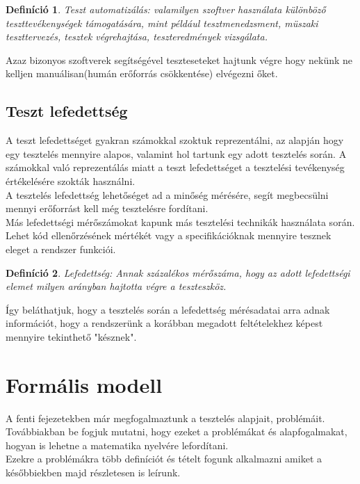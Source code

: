 \documentclass[12pt]{article}
\newtheorem{defin}{Definíció}[section]
\begin{document}
\begin{defin}
Teszt automatizálás: valamilyen szoftver használata különböző teszttevékenységek támogatására, mint például tesztmenedzsment, müszaki teszttervezés, tesztek végrehajtása, teszteredmények vizsgálata. ~\cite{htb:masterfield}
\end{defin}

Azaz bizonyos szoftverek segítségével teszteseteket hajtunk végre hogy nekünk ne kelljen manuálisan(humán erőforrás csökkentése) elvégezni őket.\\

\subsection{Teszt lefedettség}

A teszt lefedettséget gyakran számokkal szoktuk reprezentálni, az alapján hogy egy tesztelés mennyire alapos, valamint hol tartunk egy adott tesztelés során. A számokkal való reprezentálás miatt a teszt lefedettséget a tesztelési tevékenység értékelésére szokták használni.\\
A tesztelés lefedettség lehetőséget ad a minőség mérésére, segít megbecsülni mennyi erőforrást kell még tesztelésre fordítani.\\
Más lefedettségi mérőszámokat kapunk más tesztelési technikák használata során. Lehet kód ellenőrzésének mértékét vagy a specifikációknak mennyire tesznek eleget a rendszer funkciói.\\

\begin{defin}
Lefedettség: Annak százalékos mérőszáma, hogy az adott lefedettségi elemet milyen arányban hajtotta végre a teszteszköz. ~\cite{htb:masterfield}
\end{defin}

Így beláthatjuk, hogy a tesztelés során a lefedettség mérésadatai arra adnak információt, hogy a rendszerünk a korábban megadott feltételekhez képest mennyire tekinthető "késznek".\\

\pagebreak

\section{Formális modell}

A fenti fejezetekben már megfogalmaztunk a tesztelés alapjait, problémáit. Továbbiakban be fogjuk mutatni, hogy ezeket a problémákat és alapfogalmakat, hogyan is lehetne a matematika nyelvére lefordítani.\\
Ezekre a problémákra több definíciót és tételt fogunk alkalmazni amiket a későbbiekben majd részletesen is leírunk.\\  
\end{document}
